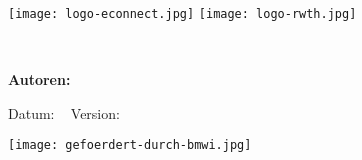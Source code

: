 \begin{titlepage}

\texttt{[image: logo-econnect.jpg]}
\hfill \texttt{[image: logo-rwth.jpg]}

\vspace{4em}

{\huge\bfseries \thistitle} \\

\vspace{4em}

{\Large\bfseries Autoren: \thisauthor}

\vspace{4em}

Datum: \thisdate ~ Version: \thisversion

\vspace{4em}

\thisabstract       

\vspace{4em}
\hfill \texttt{[image: gefoerdert-durch-bmwi.jpg]}


\end{titlepage}